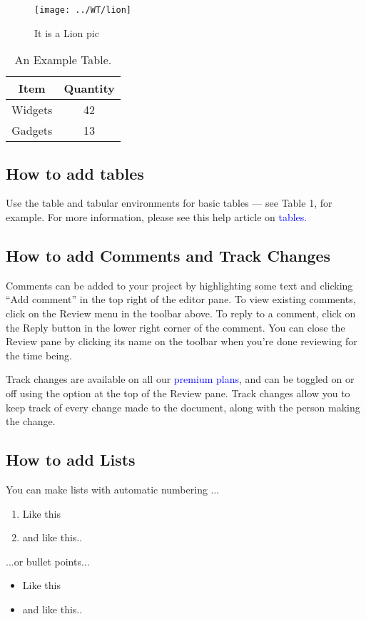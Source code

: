 \documentclass{article}
\begin{document}
	\begin{figure}[h]
		\centering
		\texttt{[image: ../WT/lion]}
		\caption{It is a Lion pic}
		\label{fig:lion}
	\end{figure}
	
	\begin{table}[h]
		\centering
		\begin{tabular}{|c|c|}
			\hline
			Item & Quantity \\
			\hline
			Widgets & 42\\
			\hline
			Gadgets & 13\\
			\hline
		\end{tabular}
		\caption{An Example Table.}
	\end{table}
	
	
	\subsection{How to add tables}
	Use the table and tabular environments for basic tables — see Table 1, for example. For more information, please see this help article on \textcolor{blue}{tables.}
	
	
	\subsection{How to add Comments and Track Changes}
	Comments can be added to your project by highlighting some text and clicking “Add comment” in the top right of the editor pane. To view existing comments, click on the Review menu in the toolbar above. To reply to a comment, click on the Reply button in the lower right corner of the comment. You can close the Review pane by clicking its name on the toolbar when you’re done reviewing for the time being. 
	\par{}Track changes are available on all our \textcolor{blue}{premium plans}, and can be toggled on or off using the option at the top of the Review pane. Track changes allow you to keep track of every change made to the document, along with the person making the change.
	
	\subsection{How to add Lists}
	You can make lists with automatic numbering ...
	\begin{enumerate}
		\item Like this
		\item and like this..
	\end{enumerate}
	...or bullet points...
	\begin{itemize}
		\item Like this
		\item and like this..
	\end{itemize}
	
\end{document}
